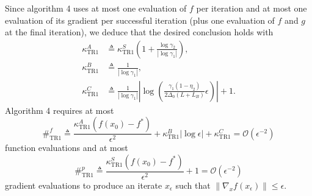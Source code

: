 \documentclass{ExerciseSheet}
\begin{document}
\begin{solution}
Since algorithm 4 uses at most one evaluation of $ f $ per iteration and at most one evaluation of its gradient per successful iteration (plus one evaluation of $f $ and $g $ at the final iteration), we deduce that the desired conclusion holds with
\begin{align}
    \kappa^A_{\text{TR1}} &\triangleq \kappa^S_{\text{TR1}} \left(1 + \frac{\log \gamma_2}{|\log \gamma_1|} \right), \\
    \kappa^B_{\text{TR1}} &\triangleq \frac{1}{|\log \gamma_1|}, \\
    \kappa^C_{\text{TR1}} &\triangleq \frac{1}{|\log \gamma_1|} \left| \log \left( \frac{\gamma_1(1 - \eta_2)}{2 \Delta_0 (L + L_B)}  \epsilon \right) \right| + 1.
\end{align}
Algorithm 4 requires at most
\begin{equation}
    \#^f_{\text{TR1}} \triangleq \frac{\kappa^A_{\text{TR1}} (f(x_0) - f^{*})}{\epsilon^2} + \kappa^B_{\text{TR1}} |\log \epsilon| + \kappa^C_{\text{TR1}} = \mathcal{O}(\epsilon^{-2})
\end{equation}
function evaluations and at most
\begin{equation}
    \#^p_{\text{TR1}} \triangleq \frac{\kappa^S_{\text{TR1}} (f(x_0) - f^{*})}{\epsilon^2} + 1 = \mathcal{O}(\epsilon^{-2})
\end{equation}
gradient evaluations to produce an iterate $ x_\epsilon $ such that $ \| \nabla_x f(x_\epsilon) \| \leq \epsilon $.
\end{solution}
\end{document}
